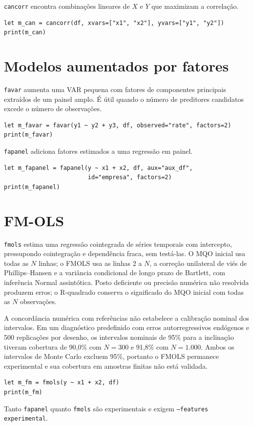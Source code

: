 \texttt{cancorr} encontra combinações lineares de $X$ e $Y$ que maximizam a
correlação.

\begin{lstlisting}[caption={Correlação canônica}]
let m_can = cancorr(df, xvars=["x1", "x2"], yvars=["y1", "y2"])
print(m_can)
\end{lstlisting}

\section{Modelos aumentados por fatores}

\texttt{favar} aumenta uma VAR pequena com fatores de componentes principais
extraídos de um painel amplo. É útil quando o número de preditores
candidatos excede o número de observações.

\begin{lstlisting}[caption={VAR aumentada por fatores}]
let m_favar = favar(y1 ~ y2 + y3, df, observed="rate", factors=2)
print(m_favar)
\end{lstlisting}

\texttt{fapanel} adiciona fatores estimados a uma regressão em painel.

\begin{lstlisting}[caption={Painel aumentado por fatores}]
let m_fapanel = fapanel(y ~ x1 + x2, df, aux="aux_df",
                        id="empresa", factors=2)
print(m_fapanel)
\end{lstlisting}

\section{FM-OLS}

\texttt{fmols} estima uma regressão cointegrada de séries temporais com
intercepto, pressupondo cointegração e dependência fraca, sem testá-las.
O MQO inicial usa todas as $N$ linhas; o FMOLS usa as linhas 2 a $N$, a
correção unilateral de viés de Phillips--Hansen e a variância condicional de
longo prazo de Bartlett, com inferência Normal assintótica. Posto deficiente ou
precisão numérica não resolvida produzem erros; o R-quadrado conserva o
significado do MQO inicial com todas as $N$ observações.

A concordância numérica com referências não estabelece a calibração nominal
dos intervalos. Em um diagnóstico predefinido com erros autorregressivos
endógenos e 500 replicações por desenho, os intervalos nominais de 95\% para
a inclinação tiveram cobertura de 90,0\% com $N=300$ e 91,8\% com $N=1.000$.
Ambos os intervalos de Monte Carlo excluem 95\%, portanto o FMOLS permanece
experimental e sua cobertura em amostras finitas não está validada.

\begin{lstlisting}[caption={FM-OLS}]
let m_fm = fmols(y ~ x1 + x2, df)
print(m_fm)
\end{lstlisting}

Tanto \texttt{fapanel} quanto \texttt{fmols} são experimentais e
exigem \texttt{--features experimental}.
